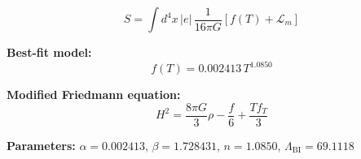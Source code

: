 
\begin{equation}
  S = \int d^4x \, |e| \, \frac{1}{16\pi G} \left[ f(T) + \mathcal{L}_m \right]
\end{equation}

\textbf{Best-fit model:}
\begin{equation}
  f(T) = 0.002413 \, T^{1.0850}
\end{equation}

\textbf{Modified Friedmann equation:}
\begin{equation}
  H^2 = \frac{8\pi G}{3} \rho - \frac{f}{6} + \frac{T f_T}{3}
\end{equation}

\textbf{Parameters:}
$\alpha = 0.002413$, \quad
$\beta = 1.728431$, \quad
$n = 1.0850$, \quad
$\Lambda_{\text{BI}} = 69.1118$